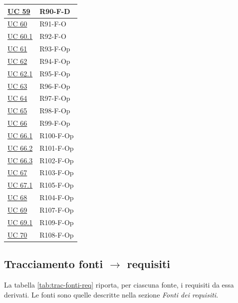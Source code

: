 {\begin{longtable}{|>{\raggedright\arraybackslash}p{3.0cm}|>{\raggedright\arraybackslash}p{12.6cm}|}
    \hyperref[uc:59]{UC 59} & \mbox{R90-F-D} \\ \hline
    \hyperref[uc:60]{UC 60} & \mbox{R91-F-O} \\ \hline
    \hyperref[uc:60.1]{UC 60.1} & \mbox{R92-F-O} \\ \hline
    \hyperref[uc:61]{UC 61} & \mbox{R93-F-Op} \\ \hline
    \hyperref[uc:62]{UC 62} & \mbox{R94-F-Op} \\ \hline
    \hyperref[uc:62.1]{UC 62.1} & \mbox{R95-F-Op} \\ \hline
    \hyperref[uc:63]{UC 63} & \mbox{R96-F-Op} \\ \hline
    \hyperref[uc:64]{UC 64} & \mbox{R97-F-Op} \\ \hline
    \hyperref[uc:65]{UC 65} & \mbox{R98-F-Op} \\ \hline
    \hyperref[uc:66]{UC 66} & \mbox{R99-F-Op} \\ \hline
    \hyperref[uc:66.1]{UC 66.1} & \mbox{R100-F-Op} \\ \hline
    \hyperref[uc:66.2]{UC 66.2} & \mbox{R101-F-Op} \\ \hline
    \hyperref[uc:66.3]{UC 66.3} & \mbox{R102-F-Op} \\ \hline
    \hyperref[uc:67]{UC 67} & \mbox{R103-F-Op} \\ \hline
    \hyperref[uc:67.1]{UC 67.1} & \mbox{R105-F-Op} \\ \hline
    \hyperref[uc:68]{UC 68} & \mbox{R104-F-Op} \\ \hline
    \hyperref[uc:69]{UC 69} & \mbox{R107-F-Op} \\ \hline
    \hyperref[uc:69.1]{UC 69.1} & \mbox{R109-F-Op} \\ \hline
    \hyperref[uc:70]{UC 70} & \mbox{R108-F-Op} \\ \hline
    \end{longtable}
}

\subsection{Tracciamento fonti $\rightarrow$ requisiti}
La tabella \ref{tab:trac-fonti-req} riporta, per ciascuna fonte, i requisiti da essa derivati. Le fonti sono quelle descritte nella sezione \textit{Fonti dei requisiti}.

